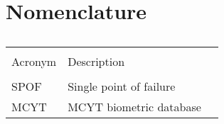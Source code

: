 \chapter{Nomenclature}


\begin{table}[ht]
\caption[Nomenclature]{\textsc{}} %
\centering %
\begin{tabular}{l l l} %
\hline\hline\\ %
 Acronym & Description \\ [0.5ex] %
\hline\\ %

	SPOF & Single point of failure \\
	MCYT &  MCYT biometric database\\[1ex] %

\hline %
\end{tabular}
\normalsize
\label{table:nomenclature} %
\end{table}

